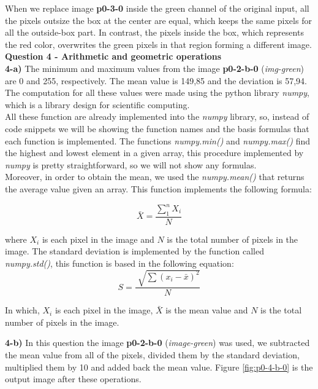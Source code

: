 \documentclass[12pt,a4paper]{article}
\begin{document}
When we replace image \textbf{p0-3-0} inside the green channel of the original input, all the pixels outsize the box at the center are equal, which keeps the same pixels for all the outside-box part. In contrast, the pixels inside the box, which represents the red color, overwrites the green pixels in that region forming a different image. \\


\textbf{Question 4 - Arithmetic and geometric operations} \\

\textbf{4-a) } The minimum and maximum values from the image \textbf{p0-2-b-0} (\emph{img-green}) are 0 and 255, respectively. The mean value is 149,85 and the deviation is 57,94. The computation for all these values were made using the python library \emph{numpy}, which is a library design for scientific computing. \\

All these function are already implemented into the \emph{numpy} library, so, instead of code snippets we will be showing the function names and the basis formulas that each function is implemented. The functions \emph{numpy.min()} and  \emph{numpy.max()} find the highest and lowest element in a given array, this procedure implemented by \emph{numpy} is pretty straightforward, so we will not show any formulas. \\

Moreover, in order to obtain the mean, we used the \emph{numpy.mean()} that returns the average value given an array. This function implements the following formula: 

$$\bar X = \frac{\sum_{1}^{n} X_i}{N}$$

where $X_i$ is each pixel in the image and $N$ is the total number of pixels in the image. The standard deviation is implemented by the function called \emph{numpy.std()}, this function is based in the following equation:
$$ S = \frac{\sqrt[]{\sum {(x_i - \bar{x})^2}}}{N} $$

In which, $X_i$ is each pixel in the image, $\bar X$ is the mean value and $N$ is the total number of pixels in the image.

\newpage

\textbf{4-b) } In this question the image \textbf{p0-2-b-0} (\emph{image-green}) was used, we subtracted the mean value from all of the pixels, divided them by the standard deviation, multiplied them by 10 and added back the mean value. Figure \ref{fig:p0-4-b-0} is the output image after these operations.
\end{document}
